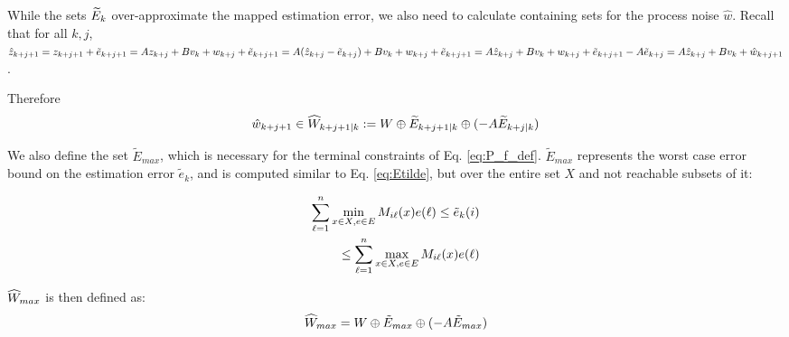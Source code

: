 While the sets $\widetilde{E}_{k}$ over-approximate the mapped estimation error, we also need to calculate containing sets for the process noise $\hat{w}$.
Recall that for all $k,j$, 
$\hat{z}_{k+j+1} = z_{k+j+1} + \tilde{e}_{k+j+1} = Az_{k+j}+Bv_k+w_{k+j} + \tilde{e}_{k+j+1} =  A(\hat{z}_{k+j} - \tilde{e}_{k+j}) + Bv_k + w_{k+j} + \tilde{e}_{k+j+1} = A\hat{z}_{k+j} + Bv_k + w_{k+j} + \tilde{e}_{k+j+1} - A \tilde{e}_{k+j} = A\hat{z}_{k+j} + Bv_k + \hat{w}_{k+j+1}$.

Therefore 
\begin{equation}
\label{eq:What}
\hat{w}_{k+j+1} \in \widehat{W}_{k+j+1|k} := W \oplus \widetilde{E}_{k+j+1|k} \oplus(-A\widetilde{E}_{k+j|k})
\end{equation}

We also define the set $\tilde{E}_{max}$, which is necessary for the terminal constraints of Eq. \ref{eq:P_f_def}. $\tilde{E}_{max}$ represents the worst case error bound on the estimation error $\tilde{e}_k$, and is computed similar to Eq. \ref{eq:Etilde}, but over the entire set $X$ and not reachable subsets of it:

\begin{eqnarray}
\label{eq:EtildeMax}
\sum_{\ell=1}^{n} \min_{x \in X, e \in E} M_{i\ell}(x)e(\ell)  \leq \tilde{e}_{k}(i) 
\nonumber 
\\
\leq \sum_{\ell=1}^{n} \max_{x \in X, e \in E} M_{i\ell}(x)e(\ell)
\end{eqnarray}

$\widehat{W}_{max}$ is then defined as:
\begin{equation}
\widehat{W}_{max} = W \oplus \tilde{E}_{max} \oplus (-A\tilde{E}_{max})
\end{equation}

